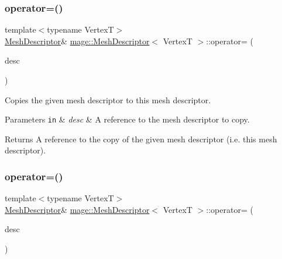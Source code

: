 \subsubsection{\texorpdfstring{operator=()}{operator=()}\hspace{0.1cm}{\footnotesize\ttfamily [1/2]}}
{\footnotesize\ttfamily template$<$typename VertexT$>$ \\
\hyperlink{structmage_1_1_mesh_descriptor}{Mesh\+Descriptor}\& \hyperlink{structmage_1_1_mesh_descriptor}{mage\+::\+Mesh\+Descriptor}$<$ VertexT $>$\+::operator= (\begin{DoxyParamCaption}\item[{const \hyperlink{structmage_1_1_mesh_descriptor}{Mesh\+Descriptor}$<$ VertexT $>$ \&}]{desc }\end{DoxyParamCaption})\hspace{0.3cm}{\ttfamily [default]}}

Copies the given mesh descriptor to this mesh descriptor.


\begin{DoxyParams}[1]{Parameters}
\mbox{\tt in}  & {\em desc} & A reference to the mesh descriptor to copy. \\
\hline
\end{DoxyParams}
\begin{DoxyReturn}{Returns}
A reference to the copy of the given mesh descriptor (i.\+e. this mesh descriptor). 
\end{DoxyReturn}
\hypertarget{structmage_1_1_mesh_descriptor_aee596eaa945924860d9a26daa58d8f45}{}\label{structmage_1_1_mesh_descriptor_aee596eaa945924860d9a26daa58d8f45} 
\subsubsection{\texorpdfstring{operator=()}{operator=()}\hspace{0.1cm}{\footnotesize\ttfamily [2/2]}}
{\footnotesize\ttfamily template$<$typename VertexT$>$ \\
\hyperlink{structmage_1_1_mesh_descriptor}{Mesh\+Descriptor}\& \hyperlink{structmage_1_1_mesh_descriptor}{mage\+::\+Mesh\+Descriptor}$<$ VertexT $>$\+::operator= (\begin{DoxyParamCaption}\item[{\hyperlink{structmage_1_1_mesh_descriptor}{Mesh\+Descriptor}$<$ VertexT $>$ \&\&}]{desc }\end{DoxyParamCaption})\hspace{0.3cm}{\ttfamily [default]}}

